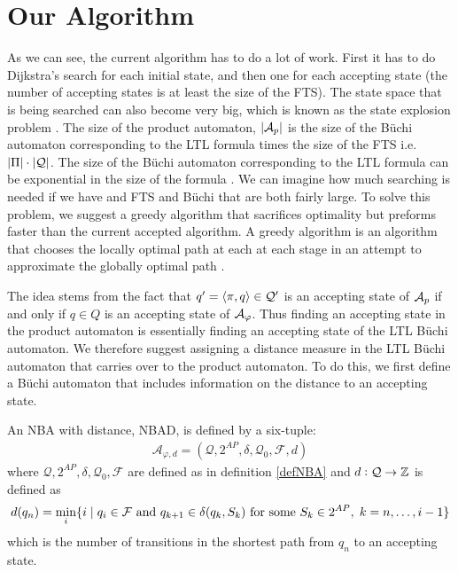 \section{Our Algorithm}
As we can see, the current algorithm has to do a lot of work. First it has to do Dijkstra's search for each initial state, and then one for each accepting state (the number of accepting states is at least the size of the FTS). The state space that is being searched can also become very big, which is known as the state explosion problem \cite{clarke99}. The size of the product automaton, $|\mathcal{A}_p|$ is the size of the B\"{u}chi automaton corresponding to the LTL formula times the size of the FTS i.e.\ $|\Pi| \cdot |\mathcal{Q}|$. The size of the B\"{u}chi automaton corresponding to the LTL formula can be exponential in the size of the formula \cite{giannakopoulou02}. We can imagine how much searching is needed if we have and FTS and B\"{u}chi that are both fairly large. To solve this problem, we suggest a greedy algorithm that sacrifices optimality but preforms faster than the current accepted algorithm. A greedy algorithm is an algorithm that chooses the locally optimal path at each at each stage in an attempt to approximate the globally optimal path \cite{cormen01}.

The idea stems from the fact that $q' = \langle \pi, q \rangle \in \mathcal{Q}'$ is an accepting state of $\mathcal{A}_p$ if and only if $q \in Q$ is an accepting state of $\mathcal{A}_\varphi$. Thus finding an accepting state in the product automaton is essentially finding an accepting state of the LTL B\"{u}chi automaton. We therefore suggest assigning a distance measure in the LTL B\"{u}chi automaton that carries over to the product automaton. To do this, we first define a B\"{u}chi automaton that includes information on the distance to an accepting state.

\begin{definition}
\label{defBWD}
An NBA with distance, NBAD, is defined by a six-tuple:
\begin{align*}
\mathcal{A}_{\varphi,d} = (\mathcal{Q},2^{AP},\delta,\mathcal{Q}_0,\mathcal{F},d)
\end{align*}
where $\mathcal{Q},2^{AP},\delta,\mathcal{Q}_0,\mathcal{F}$ are defined as in definition \ref{defNBA} and $d:\mathcal{Q} \rightarrow \mathbb{Z}$ is defined as 
\begin{align*}
d(q_n) = \min_i \{ i \hspace{0.1cm}|\hspace{0.1cm} q_i \in \mathcal{F} \text{ and } q_{k+1} \in \delta(q_{k},S_{k}) \text{ for some } S_k \in 2^{AP},\hspace{0.1cm} k = n,\dots, i-1 \}
\end{align*}
which is the number of transitions in the shortest path from $q_n$ to an accepting state.
\end{definition}

